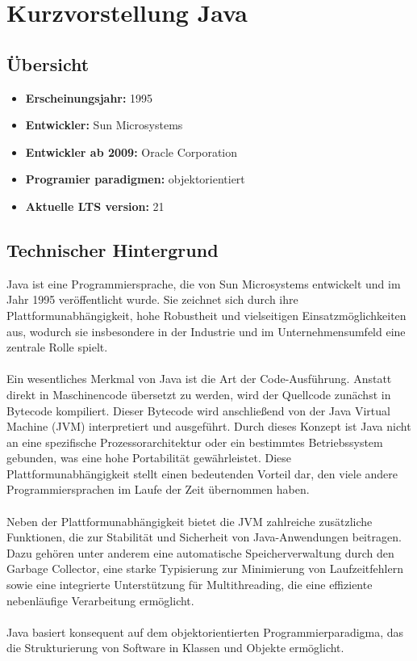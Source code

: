 \documentclass[11pt]{article}
\begin{document}
    \section{Kurzvorstellung Java}

    \subsection{Übersicht}
    \begin{itemize}
        \item \textbf{Erscheinungsjahr:} 1995
        \item \textbf{Entwickler:} Sun Microsystems
        \item \textbf{Entwickler ab 2009:} Oracle Corporation
        \item \textbf{Programier paradigmen:} objektorientiert
        \item \textbf{Aktuelle LTS version:} 21
    \end{itemize}

    \subsection{Technischer Hintergrund}
    Java ist eine Programmiersprache, die von Sun Microsystems entwickelt und im Jahr 1995 veröffentlicht wurde.
    Sie zeichnet sich durch ihre Plattformunabhängigkeit, hohe Robustheit und vielseitigen Einsatzmöglichkeiten aus,
    wodurch sie insbesondere in der Industrie und im Unternehmensumfeld eine zentrale Rolle spielt.\\
    \\
    Ein wesentliches Merkmal von Java ist die Art der Code-Ausführung.
    Anstatt direkt in Maschinencode übersetzt zu werden, wird der Quellcode zunächst in Bytecode kompiliert.
    Dieser Bytecode wird anschließend von der Java Virtual Machine (JVM) interpretiert und ausgeführt.
    Durch dieses Konzept ist Java nicht an eine spezifische Prozessorarchitektur oder ein
    bestimmtes Betriebssystem gebunden, was eine hohe Portabilität gewährleistet.
    Diese Plattformunabhängigkeit stellt einen bedeutenden Vorteil dar, den
    viele andere Programmiersprachen im Laufe der Zeit übernommen haben.\\
    \\
    Neben der Plattformunabhängigkeit bietet die JVM zahlreiche zusätzliche
    Funktionen, die zur Stabilität und Sicherheit von Java-Anwendungen beitragen.
    Dazu gehören unter anderem eine automatische Speicherverwaltung
    durch den Garbage Collector, eine starke Typisierung zur Minimierung
    von Laufzeitfehlern sowie eine integrierte Unterstützung für Multithreading,
    die eine effiziente nebenläufige Verarbeitung ermöglicht. \cite[51 - 54]{insel}\\
    \\
    Java basiert konsequent auf dem objektorientierten Programmierparadigma, das die Strukturierung von Software in Klassen und Objekte ermöglicht. \\
    \\
\end{document}
